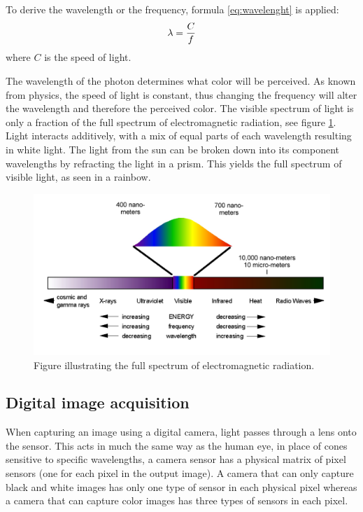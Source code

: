 To derive the wavelength or the frequency, formula \ref{eq:wavelenght} is applied:
\begin{align}
\centering 
\lambda = \frac{C}{f}
\label{eq:wavelenght} 
\end{align}
where {$C$} is the speed of light.

The wavelength of the photon determines what color will be perceived. As known from physics, the speed of light is constant, thus changing the frequency will alter the wavelength and therefore the perceived color. The visible spectrum of light is only a fraction of the full spectrum of electromagnetic radiation, see figure \ref{fig:em_rad}. Light interacts additively, with a mix of equal parts of each wavelength resulting in white light. The light from the sun can be broken down into its component wavelengths by refracting the light in a prism. This yields the full spectrum of visible light, as seen in a rainbow.

\begin{figure}[htbp] 
\centering 
\includegraphics[width=1\textwidth]{Pictures/Theory/em_rad.png} 
\caption{Figure illustrating the full spectrum of electromagnetic radiation.} 
\label{fig:em_rad} 
\end{figure}

\subsection{Digital image acquisition}
When capturing an image using a digital camera, light passes through a lens onto the sensor. This acts in much the same way as the human eye, in place of cones sensitive to specific wavelengths, a camera sensor has a physical matrix of pixel sensors (one for each pixel in the output image). A camera that can only capture black and white images has only one type of sensor in each physical pixel whereas a camera that can capture color images has three types of sensors in each pixel\citep{ip_book}.


